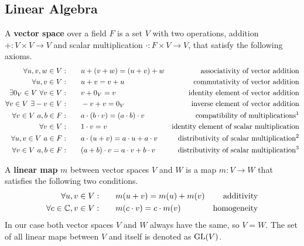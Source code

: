 \subsection{Linear Algebra}

A \textbf{vector space} over a field $F$ is a set $V$ with two operations, addition $+: V \times V \to V$ and scalar multiplication $\cdot: F \times V \to V$, that satisfy the following axioms.
\begin{align}
    \forall u, v, w \in V: \qquad & u + (v + w) = (u + v) + w & \text{associativity of vector addition} \\
    \forall u, v \in V: \qquad & u + v = v + u & \text{commutativity of vector addition} \\
    \exists 0_V \in V\ \forall v \in V: \qquad & v + 0_V = v & \text{identity element of vector addition} \\
    \forall v \in V\ \exists -v \in V: \qquad & -v + v = 0_V & \text{inverse element of vector addition} \\
    \forall v \in V\ a, b \in F: \qquad & a \cdot (b \cdot v) = (a \cdot b) \cdot v & \text{compatibility of multiplications\footnotemark} \\
    \forall v \in V: \qquad & 1 \cdot v = v & \text{identity element of scalar multiplication} \\
    \forall u, v \in V\ a \in F: \qquad & a \cdot (u + v) = a \cdot u + a \cdot v & \text{distributivity of scalar multiplication\footnotemark} \\
    \forall v \in V\ a, b \in F: \qquad & (a + b) \cdot v = a \cdot v + b \cdot v & \text{distributivity of scalar multiplication\footnotemark}
\end{align}

A \textbf{linear map} $m$ between vector spaces $V$ and $W$ is a map $m: V \to W$ that satisfies the following two conditions.
\begin{align}
    \forall u, v \in V: \qquad & m(u + v) = m(u) + m(v) & \text{additivity} \\
    \forall c \in \mathbb{C}, v \in V: \qquad & m(c \cdot v) = c \cdot m(v) & \text{homogeneity}
\end{align}
In our case both vector spaces $V$ and $W$ always have the same, so $V = W$.
The set of all linear maps between $V$ and itself is denoted as $\text{GL}(V)$.
\\

